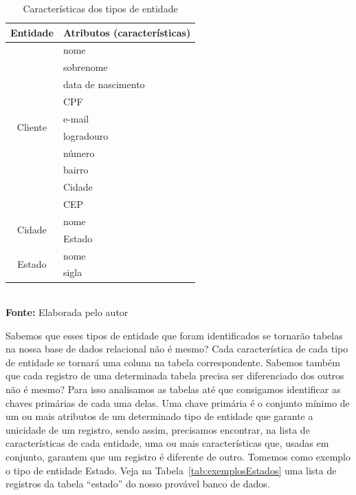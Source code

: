 \FloatBarrier
\begin{table}[ht]
    \centering
    \caption{Características dos tipos de entidade}
	\begin{tabular}{cl}
	    \hline
	        \textbf{Entidade}     & \textbf{Atributos (características)} \\ \hline
	    \multirow{10}{*}{Cliente} & nome                                \\
	                              & sobrenome                           \\
	                              & data de nascimento                  \\
	                              & CPF                                 \\
	                              & e-mail                              \\
	                              & logradouro                          \\
	                              & número                              \\
	                              & bairro                              \\
	                              & Cidade                              \\
	                              & CEP                                 \\ \hline
	     \multirow{2}{*}{Cidade}  & nome                                \\
	                              & Estado                              \\ \hline
	     \multirow{2}{*}{Estado}  & nome                                \\
	                              & sigla                               \\ \hline
	\end{tabular}
    \\ \vspace{0.2cm}
    \textbf{Fonte:} Elaborada pelo autor
    \label{tab:caracteristicasEntidades}
\end{table}
\FloatBarrier

Sabemos que esses tipos de entidade que foram identificados se tornarão tabelas na nossa base de dados relacional não é mesmo? Cada característica de cada tipo de entidade se tornará uma coluna na tabela correspondente. Sabemos também que cada registro de uma determinada tabela precisa ser diferenciado dos outros não é mesmo? Para isso analisamos as tabelas até que consigamos identificar as chaves primárias de cada uma delas. Uma chave primária é o conjunto mínimo de um ou mais atributos de um determinado tipo de entidade que garante a unicidade de um registro, sendo assim, precisamos encontrar, na lista de características de cada entidade, uma ou mais características que, usadas em conjunto, garantem que um registro é diferente de outro. Tomemos como exemplo o tipo de entidade Estado. Veja na Tabela~\ref{tab:exemplosEstados} uma lista de registros da tabela ``estado'' do nosso provável banco de dados.

